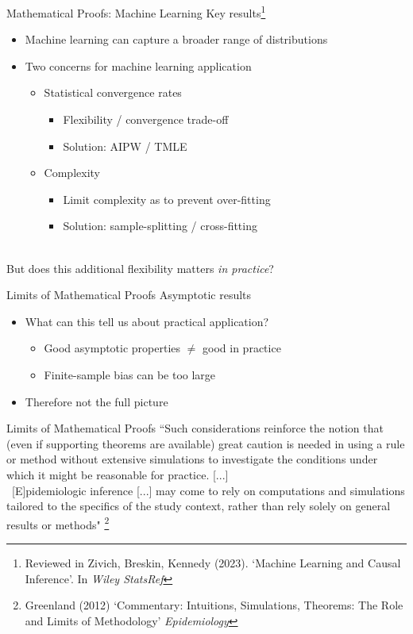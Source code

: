 \documentclass{beamer}
\begin{document}
\begin{frame}{Mathematical Proofs: Machine Learning}
	Key results\footnote[frame]{Reviewed in Zivich, Breskin, Kennedy (2023). `Machine Learning and Causal Inference'. In \textit{Wiley StatsRef}}
	\begin{itemize}
		\item Machine learning can capture a broader range of distributions
		\item Two concerns for machine learning application
		\begin{itemize}
			\item Statistical convergence rates
			\begin{itemize}
				\item Flexibility / convergence trade-off
				\item Solution: AIPW / TMLE
			\end{itemize}
			\item Complexity
			\begin{itemize}
				\item Limit complexity as to prevent over-fitting
				\item Solution: sample-splitting / cross-fitting
			\end{itemize}
		\end{itemize}
	\end{itemize}~\\
	But does this additional flexibility matters \textit{in practice}?
\end{frame}

\begin{frame}{Limits of Mathematical Proofs}
	Asymptotic results
	\begin{itemize}
		\item What can this tell us about practical application?
		\begin{itemize}
			\item Good asymptotic properties $\ne$ good in practice
			\item Finite-sample bias can be too large
		\end{itemize}
		\item Therefore not the full picture
	\end{itemize}
\end{frame}

\begin{frame}{Limits of Mathematical Proofs}
	``Such considerations reinforce the notion that (even if supporting theorems are available) great caution is needed in using a rule or method without extensive simulations to investigate the conditions under which it might be reasonable for practice. [...] 
	\\ ~[E]pidemiologic inference [...] may come to rely on computations and simulations tailored to the specifics of the study context, rather than rely solely on general results or methods"
	\footnote[frame]{Greenland (2012) `Commentary: Intuitions, Simulations, Theorems: The Role and Limits of Methodology' \textit{Epidemiology}}
\end{frame}
\end{document}
